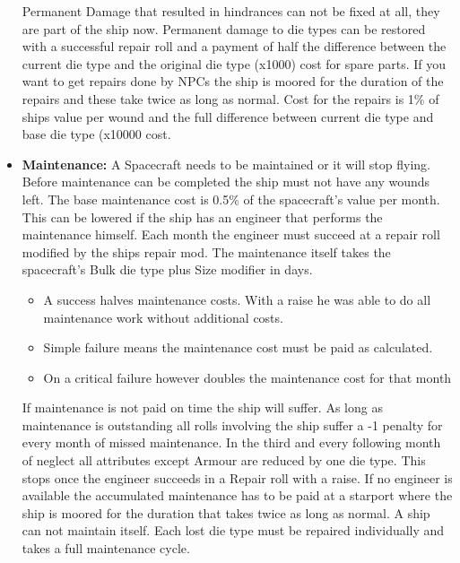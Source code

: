 \begin{multicols}{2}
\begin{itemize}
\begin{itemize}
  \end{itemize}
  Permanent Damage that resulted in hindrances can not be fixed at all, they are part of the ship now. Permanent damage to die types can be restored with a successful repair roll and a payment of half the difference between the current die type and the original die type (x1000) cost for spare parts. If you want to get repairs done by NPCs the ship is moored for the duration of the repairs and these take twice as long as normal. Cost for the repairs is 1\% of ships value per wound and the full difference between current die type and base die type (x10000 cost.
  \item \textbf{Maintenance:} A Spacecraft needs to be maintained or it will stop flying. Before maintenance can be completed the ship must not have any wounds left. The base maintenance cost is 0.5\% of the spacecraft's value per month. This can be lowered if the ship has an engineer that performs the maintenance himself. Each month the engineer must succeed at a repair roll modified by the ships repair mod. The maintenance itself takes the spacecraft's Bulk die type plus Size modifier in days. 
  \begin{itemize}
    \item A success halves maintenance costs. With a raise he was able to do all maintenance work without additional costs.
    \item Simple failure means the maintenance cost must be paid as calculated.
    \item On a critical failure however doubles the maintenance cost for that month
  \end{itemize}
  If maintenance is not paid on time the ship will suffer. As long as maintenance is outstanding all rolls involving the ship suffer a -1
penalty for every month of missed maintenance. In the third and every following month of neglect all attributes except Armour are reduced by one die type. This stops once the engineer succeeds in a Repair roll with a raise. If no engineer is available the accumulated maintenance has to be paid at a starport where the ship is moored for the duration that takes twice as long as normal. A ship can not maintain itself. Each lost die type must be repaired individually and takes a full maintenance cycle.
\end{itemize}


\end{multicols}
